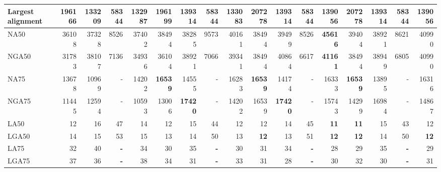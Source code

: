 \documentclass[12pt,a4paper]{article}
\begin{document}
\begin{table}[ht]
\begin{center}
\begin{tabular}{|l*{16}{|r}|}
Largest alignment & 196166 & 133209 & 58344 & 132987 & 196199 & 139314 & 58344 & 133083 & {\bf 207278} & 139314 & 58344 & 139056 & {\bf 207278} & 139314 & 58344 & 139056 \\ \hline
NA50 & 36108 & 37328 & 8526 & 37402 & 38494 & 38285 & 9573 & 40161 & 38494 & 39499 & 8526 & {\bf 45616} & 39404 & 38921 & 8621 & 40990 \\ \hline
NGA50 & 31783 & 38107 & 7136 & 34936 & 36104 & 38921 & 7066 & 39341 & 38494 & 40864 & 6617 & {\bf 41161} & 38494 & 38949 & 6805 & 40990 \\ \hline
NA75 & 13678 & 10969 & - & 14202 & {\bf 16539} & 14555 & - & 16283 & {\bf 16539} & 14174 & - & 16333 & {\bf 16539} & 13895 & - & 16316 \\ \hline
NGA75 & 11445 & 12594 & - & 10593 & 13006 & {\bf 17420} & - & 14202 & 16539 & {\bf 17420} & - & 15743 & 14299 & 16984 & - & 14867 \\ \hline
LA50 & 12 & 16 & 47 & 14 & 12 & 15 & 44 & 12 & 12 & 14 & 45 & {\bf 11} & {\bf 11} & 15 & 43 & 12 \\ \hline
LGA50 & 14 & 15 & 53 & 15 & 13 & 14 & 50 & 13 & {\bf 12} & 13 & 51 & {\bf 12} & {\bf 12} & 14 & 50 & {\bf 12} \\ \hline
LA75 & 32 & 40 & {\bf -} & 34 & 30 & 35 & {\bf -} & 30 & 31 & 34 & {\bf -} & 28 & 29 & 35 & {\bf -} & 29 \\ \hline
LGA75 & 37 & 36 & {\bf -} & 38 & 34 & 31 & {\bf -} & 33 & 31 & 28 & {\bf -} & 30 & 32 & 30 & {\bf -} & 31 \\ \hline
\end{tabular}
\end{center}
\end{table}
\end{document}
